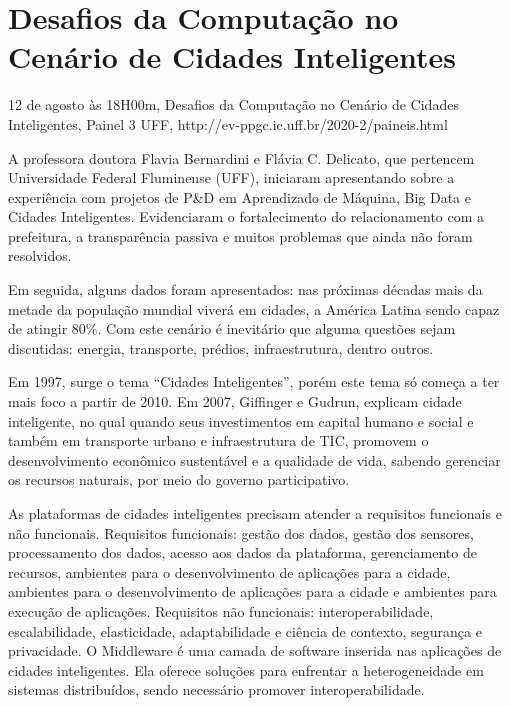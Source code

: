 \section{Desafios da Computação no Cenário de Cidades Inteligentes}

\begin{center}
  \vspace{1cm}
  12 de agosto às 18H00m, Desafios da Computação no Cenário de Cidades Inteligentes, Painel 3 UFF, http://ev-ppgc.ic.uff.br/2020-2/paineis.html
  \vspace{1cm}
\end{center}

A professora doutora Flavia Bernardini e Flávia C. Delicato, que pertencem Universidade Federal Fluminense (UFF), iniciaram apresentando sobre a experiência com projetos de P\&D em Aprendizado de Máquina, Big Data e Cidades Inteligentes. Evidenciaram o fortalecimento do relacionamento com a prefeitura, a transparência passiva e muitos problemas que ainda não foram resolvidos.

Em seguida, alguns dados foram apresentados: nas próximas décadas mais da metade da população mundial viverá em cidades, a América Latina sendo capaz de atingir 80\%. Com este cenário é inevitário que alguma questões sejam discutidas: energia, transporte, prédios, infraestrutura, dentro outros.

Em 1997, surge o tema “Cidades Inteligentes”, porém este tema só começa a ter mais foco a partir de 2010. Em 2007, Giffinger e Gudrun, explicam cidade inteligente, no qual quando seus investimentos em capital humano e social e também em transporte urbano e infraestrutura de TIC, promovem o desenvolvimento econômico sustentável e a qualidade de vida, sabendo gerenciar os recursos naturais, por meio do governo participativo.

As plataformas de cidades inteligentes precisam atender a requisitos funcionais e não funcionais. Requisitos funcionais: gestão dos dados, gestão dos sensores, processamento dos dados, acesso aos dados da plataforma, gerenciamento de recursos, ambientes para o desenvolvimento de aplicações para a cidade, ambientes para o desenvolvimento de aplicações para a cidade e ambientes para execução de aplicações. Requisitos não funcionais: interoperabilidade, escalabilidade, elasticidade, adaptabilidade e ciência de contexto, segurança e privacidade. 
O Middleware é uma camada de software inserida nas aplicações de cidades inteligentes. Ela oferece soluções para enfrentar a heterogeneidade em sistemas distribuídos, sendo necessário promover interoperabilidade.

